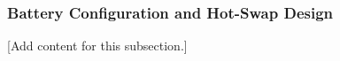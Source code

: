
\subsubsection{Battery Configuration and Hot-Swap Design}
\label{subsubsec:design_2_2_1_battery_hotswap_design}

[Add content for this subsection.]
